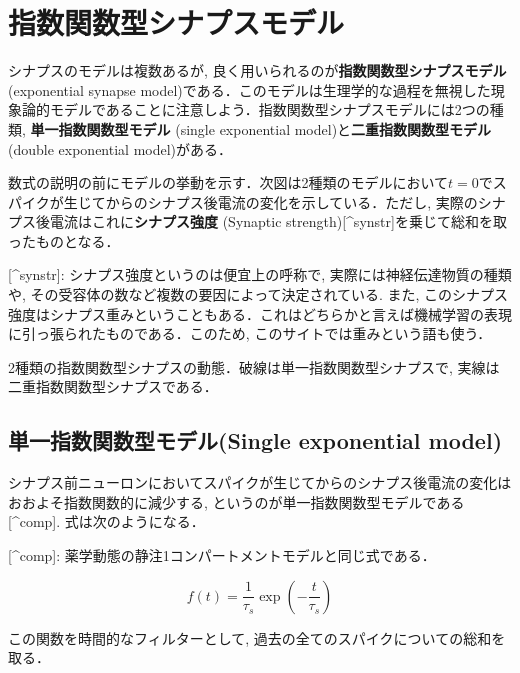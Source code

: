 \section{指数関数型シナプスモデル}
シナプスのモデルは複数あるが, 良く用いられるのが\textbf{指数関数型シナプスモデル}(exponential synapse model)である．このモデルは生理学的な過程を無視した現象論的モデルであることに注意しよう．指数関数型シナプスモデルには2つの種類, \textbf{単一指数関数型モデル} (single exponential model)と\textbf{二重指数関数型モデル} (double exponential model)がある．

数式の説明の前にモデルの挙動を示す．次図は2種類のモデルにおいて$t=0$でスパイクが生じてからのシナプス後電流の変化を示している．ただし, 実際のシナプス後電流はこれに\textbf{シナプス強度} (Synaptic strength)[^synstr]を乗じて総和を取ったものとなる．

[^synstr]: シナプス強度というのは便宜上の呼称で, 実際には神経伝達物質の種類や, その受容体の数など複数の要因によって決定されている. また, このシナプス強度はシナプス重みということもある．これはどちらかと言えば機械学習の表現に引っ張られたものである．このため, このサイトでは重みという語も使う．




2種類の指数関数型シナプスの動態．破線は単一指数関数型シナプスで, 実線は二重指数関数型シナプスである．
\subsection{単一指数関数型モデル(Single exponential model)}
シナプス前ニューロンにおいてスパイクが生じてからのシナプス後電流の変化はおおよそ指数関数的に減少する, というのが単一指数関数型モデルである [^comp]. 式は次のようになる．

[^comp]: 薬学動態の静注1コンパートメントモデルと同じ式である．


\begin{equation}
f(t)=\frac{1}{\tau_{s}}\exp\left(-\frac{t}{\tau_s}\right)    
\end{equation}


この関数を時間的なフィルターとして, 過去の全てのスパイクについての総和を取る．


